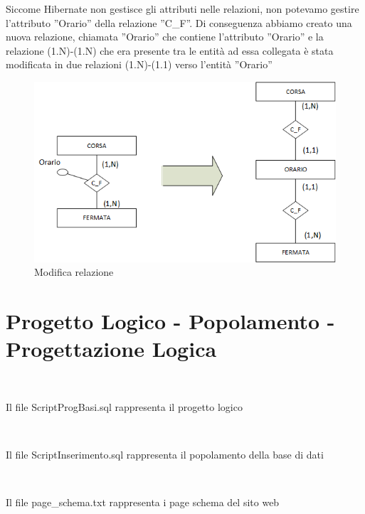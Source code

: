 \documentclass[a4paper,11pt]{book}
\begin{document}
\clearpage

Siccome Hibernate non gestisce gli attributi nelle relazioni, non potevamo gestire l'attributo ''Orario'' della relazione ''C\_F''. 
Di conseguenza abbiamo creato una nuova relazione, chiamata ''Orario'' che contiene l'attributo ''Orario'' e la relazione (1.N)-(1.N) che era presente tra le entità ad essa collegata è stata modificata in due relazioni (1.N)-(1.1) verso l'entità ''Orario''


\begin{figure}[!ht]
\centering
\includegraphics[scale = 1]{Modifica.png}
\caption{Modifica relazione}
\end{figure}

\chapter{Progetto Logico - Popolamento - Progettazione Logica}

~

Il file ScriptProgBasi.sql rappresenta il progetto logico

~

Il file ScriptInserimento.sql rappresenta il popolamento della base di dati

~

Il file page\_schema.txt rappresenta i page schema del sito web
\end{document}
